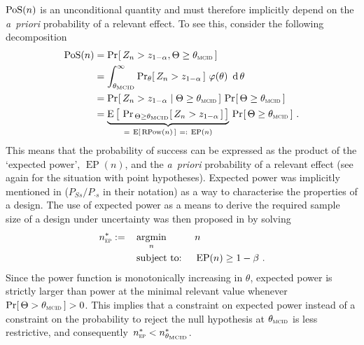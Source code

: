\documentclass{article}
\renewcommand{\Pr}{\operatorname{Pr}}
\newcommand{\E}{\operatorname{E}}
\newcommand{\st}{\operatorname{subject\ to:\ }}
\newcommand{\argmin}[1]{\operatornamewithlimits{argmin}_{#1}}
\newcommand{\EP}{\operatorname{EP}}
\begin{document}
$\operatorname{PoS}(n)$ is an unconditional quantity and must therefore implicitly depend on the \textit{a~priori} probability of a relevant effect.
To see this, consider the following decomposition
\begin{align}
    \PoS(n) &=
        \Pr_{}[\,Z_n > \criticalvalue, \Theta \geq \mcid\,] \\
        &= \int_{\mcid}^\infty \Pr_\theta[\,Z_n > \criticalvalue\,]\ \varphi(\theta)\ \operatorname{d} \theta \label{eq:pos-integral} \\
        &= \Pr_{ }[\,Z_n > \criticalvalue \mid \Theta \geq \mcid\,] \, \Pr_{}[\,\Theta \geq \mcid\,] \\
        &= \underbrace{\E\big[\, \Pr_{\, \Theta \geq \mcid}[\,Z_n > \criticalvalue\,] \,\big]}_{= \ \E[\,\rpower{n}\,]\ =:\ \EP(n)} \,
        \Pr_{}[\,\Theta \geq \mcid\,]  \ .
        \label{eq:pos-and-ep}
\end{align}
This means that the probability of success can be expressed as the product of the `expected power', $\EP(n)$, and the \textit{a~priori} probability of a relevant effect (see again \citet{spiegelhalter-2004} for the situation with point hypotheses).
Expected power was implicitly mentioned in \citet{spiegelhalter1986} ($P_{Ss}/P_{\cdot s}$ in their notation) as a way to characterise the properties of a design.
The use of expected power as a means to derive the required sample size of a design under uncertainty was then proposed in \citet{brown1987projection} by solving
\begin{align}
    {n_{\scalebox{.5}{EP}}^*} :=\quad &\argmin{n} &&n \nonumber\\
                      &\st &&\EP(n) \geq 1 - \beta \ . \label{eq:ep-problem}
\end{align}
Since the power function is monotonically increasing in $\theta$, expected power is strictly larger than power at the minimal relevant value whenever $\Pr[\,\Theta>\mcid\,] > 0 $.
This implies that a constraint on expected power instead of a constraint on the probability to reject the null hypothesis at $\mcid$ is less restrictive, and consequently~${n_{\scalebox{.5}{EP}}^*}<{n^*_{\mcid}}$.
\end{document}
